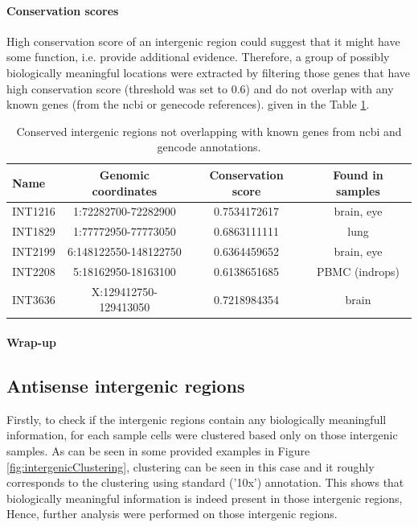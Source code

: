 \paragraph{Conservation scores}

High conservation score of an intergenic region could suggest that it might have some function, i.e. provide additional evidence.
Therefore, a group of possibly biologically meaningful locations were extracted by filtering those genes that have high conservation score
(threshold was set to 0.6) and do not overlap with any known genes (from the ncbi or genecode references). given in the Table \ref{tab:conservedIntergenic}.

\begin{table}[h]
    \centering
    \begin{tabular}{lccc}
        \toprule
        Name & Genomic coordinates & Conservation score & Found in samples \\
        \midrule
        INT1216 & 1:72282700-72282900 & 0.7534172617 & brain, eye\\
	INT1829 & 1:77772950-77773050 & 0.6863111111 & lung \\
	INT2199 & 6:148122550-148122750 & 0.6364459652 & brain, eye \\
	INT2208 & 5:18162950-18163100 & 0.6138651685 & PBMC (indrops) \\
	INT3636 & X:129412750-129413050 & 0.7218984354 & brain \\
        \bottomrule
    \end{tabular}
    \caption{Conserved intergenic regions not overlapping with known genes from ncbi and gencode annotations.}
    \label{tab:conservedIntergenic}
\end{table}


\paragraph{Wrap-up}

\subsection{Antisense intergenic regions}












\iffalse

Firstly, to check if the intergenic regions contain any biologically meaningfull information,
for each sample cells were clustered based only on those intergenic samples.
As can be seen in some provided examples in Figure \ref{fig:intergenicClustering},
clustering can be seen in this case and it roughly corresponds to the clustering using standard ('10x') annotation.
This shows that biologically meaningful information is indeed present in those intergenic regions,
Hence, further analysis were performed on those intergenic regions.

